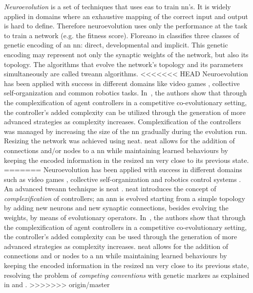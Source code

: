 \documentclass[conference]{IEEEtran}
\begin{document}
\textit{Neuroevolution} is a set of techniques that uses \glspl{ea} to train \gls{nn}'s.
It is widely applied in domains where an exhaustive mapping of the correct input and output is hard to define.
Therefore neuroevolution uses only the performance at the task to train a network (e.g. the fitness score).
Floreano in \cite{floreano2008neuroevolution} classifies three classes of genetic encoding of an \gls{nn}: direct, developmental and implicit.
This genetic encoding may represent not only the synaptic weights of the network, but also its topology.
The algorithms that evolve the network's topology and its parameters simultaneously are called \gls{tweann} algorithms.
<<<<<<< HEAD
Neuroevolution has been applied with success in different domains like video games \cite{stanley2005real} \cite{hausknecht2014neuroevolution}, collective self-organization \cite{nitschke2008neuro} \cite{nitschke2010collective} and common robotics tasks. %
In~\cite{stanley2004competitive}, the authors show that through the complexification of agent controllers in a competitive co-evolutionary setting, the controller's added complexity can be utilized through the generation of more advanced strategies as complexity increases. 
Complexification of the controllers was managed by increasing the size of the \gls{nn} gradually during the evolution run.
Resizing the network was achieved using \gls{neat}.
\gls{neat} allows for the addition of connections and/or nodes to a \gls{nn} while maintaining learned behaviours by keeping the encoded information in the resized \gls{nn} very close to its previous state.
=======
Neuroevolution has been applied with success in different domains such as video games \cite{hausknecht2014neuroevolution} \cite{stanley2005real}, collective self-organization \cite{nitschke2008neuro} \cite{nitschke2010collective} and robotics control systems \cite{brooks1989robot} \cite{floreano1996evolution} \cite{kodjabachian1998evolution}.
An advanced \gls{tweann} technique is \gls{neat} \cite{stanley2002evolving}.
\gls{neat} introduces the concept of \textit{complexification} of controllers; an \gls{ann} is evolved starting from a simple topology by adding new neurons and new synaptic connections, besides evolving the weights, by means of evolutionary operators.
In~\cite{stanley2004competitive}, the authors show that through the complexification of agent controllers in a competitive co-evolutionary setting, the controller's added complexity can be used through the generation of more advanced strategies as complexity increases.
\gls{neat} allows for the addition of connections and or nodes to a \gls{nn} while maintaining learned behaviours by keeping the encoded information in the resized \gls{nn} very close to its previous state, resolving the problem of \textit{competing conventions} with genetic markers as explained in \cite{floreano2008neuroevolution} and \cite{stanley2002evolving}.
>>>>>>> origin/master
\end{document}
